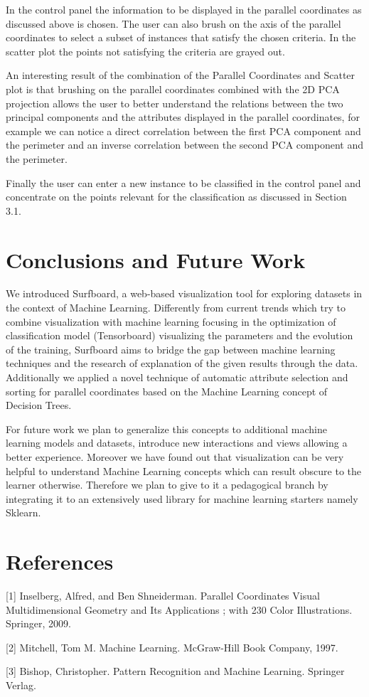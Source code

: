 \documentclass{article}
\begin{document}
In the control panel the information to be displayed in the parallel coordinates
as discussed above is chosen. The user can also brush on the axis of the
parallel coordinates to select a subset of instances that satisfy the chosen
criteria. In the scatter plot the points not satisfying the criteria are grayed
out.

An interesting result of the combination of the Parallel Coordinates and Scatter
plot is that brushing on the parallel coordinates combined with the 2D PCA
projection allows the user to better understand the relations between the two principal
components and the attributes displayed in the parallel coordinates, for example
we can notice a direct correlation between the first PCA component and the
perimeter and an inverse correlation between the second PCA component and the
perimeter.

Finally the user can enter a new instance to be classified in the control panel
and concentrate on the points relevant for the classification as discussed in
Section 3.1.


\section{Conclusions and Future Work}

We introduced Surfboard, a web-based visualization tool for exploring datasets
in the context of Machine Learning. Differently from current trends which try to
combine visualization with machine learning focusing in the optimization of
classification model (Tensorboard) visualizing the parameters and the evolution
of the training, Surfboard aims to bridge the gap between machine learning
techniques and the research of explanation of the given results through the
data. Additionally we applied a novel technique of automatic attribute selection
and sorting for parallel coordinates based on the Machine Learning concept of
Decision Trees.

For future work we plan to generalize this concepts to additional machine
learning models and datasets, introduce new interactions and views allowing a
better experience. Moreover we have found out that visualization can be very
helpful to understand Machine Learning concepts which can result obscure to the
learner otherwise. Therefore we plan to give to it a pedagogical branch by
integrating it to an extensively used library for machine learning starters
namely Sklearn.


\section*{References}

\small

[1] Inselberg, Alfred, and Ben Shneiderman. Parallel Coordinates Visual Multidimensional Geometry and Its Applications ; with 230 Color Illustrations. Springer, 2009. 

[2] Mitchell, Tom M. Machine Learning. McGraw-Hill Book Company, 1997.

[3] Bishop, Christopher. Pattern Recognition and Machine Learning. Springer Verlag. 

\fi
\end{document}
